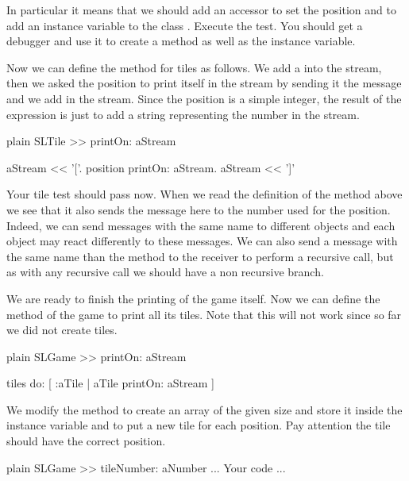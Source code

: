 \documentclass[10pt,twoside,english]{_support/latex/sbabook/sbabook}
\begin{document}
In particular it means that we should add an accessor to set the position and to add an instance variable  to the class . Execute the test. You should get a debugger and use it to create a method  as well as the instance variable.

Now we can define the  method for tiles as follows.
We add a \textcode{{[}} into the stream, then we asked the position to print itself in the stream by sending it the message  and we add \textcode{{]}}
in the stream. Since the position is a simple integer, the result of the  expression is just to add a string representing the number in the stream. 

\begin{displaycode}{plain}
SLTile >> printOn: aStream

	aStream << '['.
	position printOn: aStream.
	aStream << ']'
\end{displaycode}

Your tile test should pass now. When we read the definition of the method  above we see that it also sends the message  here to  the number used for the position. Indeed, we can send messages with the same name to different objects and each object may react differently to these messages. We can also send a message with the same name than the method to the receiver to perform a recursive call, but as with any recursive call we should have a non recursive branch.

We are ready to finish the printing of the game itself.
Now we can define the method  of the game to print all its tiles.
Note that this will not work since so far we did not create tiles. 

\begin{displaycode}{plain}
SLGame >> printOn: aStream

	tiles do: [ :aTile | 
		aTile printOn: aStream ]
\end{displaycode}

We modify the method  to create an array of the given size and store it inside the  instance variable and to put a new tile for each position. Pay attention the tile should have the correct position.

\begin{displaycode}{plain}
SLGame >> tileNumber: aNumber
	... Your code ...
\end{displaycode}
\end{document}
